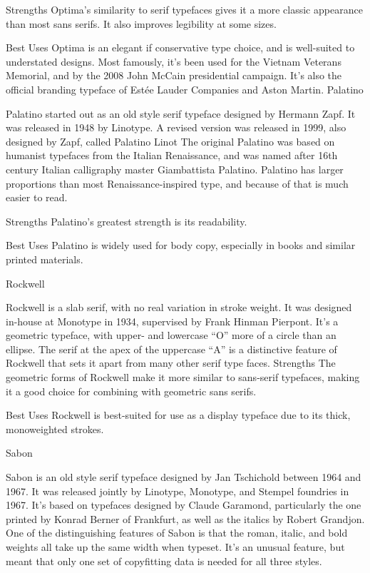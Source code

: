 \documentclass[12pt,a4paper,twocolumn]{book} %
\begin{document}
Strengths
Optima’s similarity to serif typefaces gives it a more classic appearance than most sans serifs. It also improves legibility at some sizes.

Best Uses
Optima is an elegant if conservative type choice, and is well-suited to understated designs. Most famously, it’s been used for the Vietnam Veterans Memorial, and by the 2008 John McCain presidential campaign. It’s also the official branding typeface of Estée Lauder Companies and Aston Martin.
Palatino

Palatino started out as an old style serif typeface designed by Hermann Zapf. It was released in 1948 by Linotype. A revised version was released in 1999, also designed by Zapf, called Palatino Linot
The original Palatino was based on humanist typefaces from the Italian Renaissance, and was named after 16th century Italian calligraphy master Giambattista Palatino. Palatino has larger proportions than most Renaissance-inspired type, and because of that is much easier to read.

Strengths
Palatino’s greatest strength is its readability.

Best Uses
Palatino is widely used for body copy, especially in books and similar printed materials.

 
Rockwell

Rockwell is a slab serif, with no real variation in stroke weight. It was designed in-house at Monotype in 1934, supervised by Frank Hinman Pierpont. It’s a geometric typeface, with upper- and lowercase “O” more of a circle than an ellipse. The serif at the apex of the uppercase “A” is a distinctive feature of Rockwell that sets it apart from many other serif type faces.
Strengths
The geometric forms of Rockwell make it more similar to sans-serif typefaces, making it a good choice for combining with geometric sans serifs.

Best Uses
Rockwell is best-suited for use as a display typeface due to its thick, monoweighted strokes.

 
Sabon

Sabon is an old style serif typeface designed by Jan Tschichold between 1964 and 1967. It was released jointly by Linotype, Monotype, and Stempel foundries in 1967. It’s based on typefaces designed by Claude Garamond, particularly the one printed by Konrad Berner of Frankfurt, as well as the italics by Robert Grandjon.
One of the distinguishing features of Sabon is that the roman, italic, and bold weights all take up the same width when typeset. It’s an unusual feature, but meant that only one set of copyfitting data is needed for all three styles.
\end{document}
